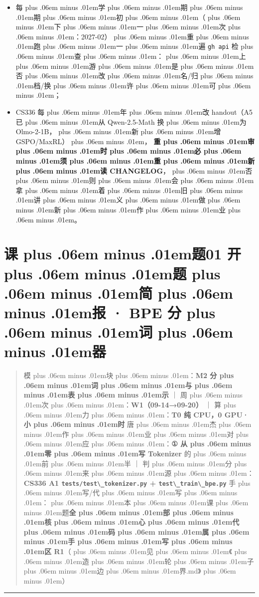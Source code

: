 \documentclass[
]{article}
\newcommand{\passthrough}[1]{#1}
\providecommand{\tightlist}{%
  \setlength{\itemsep}{0pt}\setlength{\parskip}{0pt}}
\def\zh#1{{\zhfont #1}}
\def\sym#1{{\symfont #1}}
\def\zhglue{\hskip0pt plus .06em minus .01em}
\begin{document}
\begin{itemize}
\tightlist
\item
  \zh{每\zhglue 学\zhglue 期\zhglue 期\zhglue 初\zhglue （\zhglue 下\zhglue 一\zhglue 次\zhglue ：}2027-02\zh{）\zhglue 重\zhglue 跑\zhglue 一\zhglue 遍} \passthrough{\lstinline!gh api!} \zh{检\zhglue 查\zhglue ：\zhglue 上\zhglue 游\zhglue 是\zhglue 否\zhglue 改\zhglue 名}/\zh{归\zhglue 档}/\zh{换\zhglue 许\zhglue 可\zhglue ；}
\item
  CS336 \zh{每\zhglue 年\zhglue 改} handout\zh{（}A5 \zh{已\zhglue 从} Qwen-2.5-Math \zh{换\zhglue 为} Olmo-2-1B\zh{，\zhglue 新\zhglue 增} GSPO/MaxRL\zh{）\zhglue ，} \textbf{\zh{重\zhglue 审\zhglue 时\zhglue 必\zhglue 须\zhglue 重\zhglue 新\zhglue 读} CHANGELOG}\zh{，\zhglue 否\zhglue 则\zhglue 会\zhglue 拿\zhglue 着\zhglue 旧\zhglue 讲\zhglue 义\zhglue 做\zhglue 新\zhglue 作\zhglue 业\zhglue 。}
\end{itemize}

\newpage

\section{\zh{课\zhglue 题}01 \zh{开\zhglue 题\zhglue 简\zhglue 报} \sym{·} BPE \zh{分\zhglue 词\zhglue 器}}\label{ux8bfeux989801-ux5f00ux9898ux7b80ux62a5-bpe-ux5206ux8bcdux5668}

\begin{quote}
\zh{模\zhglue 块\zhglue ：}\textbf{M2 \zh{分\zhglue 词\zhglue 与\zhglue 表\zhglue 示}} \zh{｜} \zh{周\zhglue 次\zhglue ：}\textbf{W1\zh{（}09-14\sym{→}09-20\zh{）}} \zh{｜} \zh{算\zhglue 力\zhglue ：}\textbf{T0 \zh{纯} CPU\zh{，}0 GPU\sym{·}\zh{小\zhglue 时}} \zh{唐\zhglue 杰\zhglue 作\zhglue 业\zhglue 对\zhglue 应\zhglue ：}\textbf{\sym{①} \zh{从\zhglue 零\zhglue 写} Tokenizer} \zh{的\zhglue 前\zhglue 半} \zh{｜} \zh{判\zhglue 分\zhglue 来\zhglue 源\zhglue ：}\textbf{CS336 A1 \passthrough{\lstinline!tests/test\_tokenizer.py!} + \passthrough{\lstinline!test\_train\_bpe.py!}} \zh{手\zhglue 写}/\zh{代\zhglue 写\zhglue ：\zhglue 本\zhglue 课\zhglue 题}\textbf{\zh{全\zhglue 部\zhglue 核\zhglue 心\zhglue 代\zhglue 码\zhglue 属\zhglue 手\zhglue 写\zhglue 区} R1}\zh{（\zhglue 见\zhglue 《\zhglue 造\zhglue 轮\zhglue 子\zhglue 边\zhglue 界}.md\zh{》\zhglue ）}
\end{quote}

\begin{center}\rule{0.5\linewidth}{0.5pt}\end{center}
\end{document}
